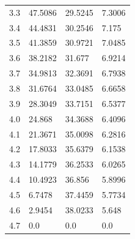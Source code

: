 \begin{tabular}{llll}
3.3 & 47.5086 & 29.5245 & 7.3006 \\
3.4 & 44.4831 & 30.2546 & 7.175 \\
3.5 & 41.3859 & 30.9721 & 7.0485 \\
3.6 & 38.2182 & 31.677 & 6.9214 \\
3.7 & 34.9813 & 32.3691 & 6.7938 \\
3.8 & 31.6764 & 33.0485 & 6.6658 \\
3.9 & 28.3049 & 33.7151 & 6.5377 \\
4.0 & 24.868 & 34.3688 & 6.4096 \\
4.1 & 21.3671 & 35.0098 & 6.2816 \\
4.2 & 17.8033 & 35.6379 & 6.1538 \\
4.3 & 14.1779 & 36.2533 & 6.0265 \\
4.4 & 10.4923 & 36.856 & 5.8996 \\
4.5 & 6.7478 & 37.4459 & 5.7734 \\
4.6 & 2.9454 & 38.0233 & 5.648 \\
4.7 & 0.0 & 0.0 & 0.0 \\
\bottomrule
\end{tabular}
